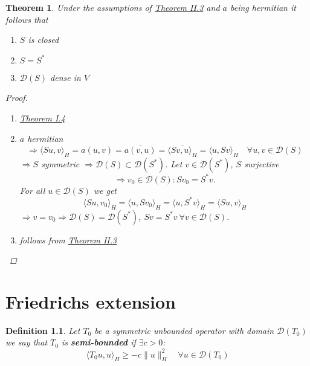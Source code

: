\documentclass[12pt]{extreport} %
\newcommand{\DO}[1]{\mathcal{D}\left( {#1} \right)}
\theoremstyle{named}
\theoremstyle{nnamed}
\theoremstyle{itshape}
\newtheorem{definition}{Definition}  \counterwithin{definition}{chapter}
\newtheorem{theorem}{Theorem}  \counterwithin{theorem}{chapter}
\theoremstyle{normal}
\begin{document}
\begin{theorem}
	Under the assumptions of \hyperref[thm:2.3]{Theorem II.3} and $a$ being hermitian it follows that
		\begin{enumerate}
			\item $S$ is closed
			\item $S = S^*$
			\item $\DO{S}$ dense in $V$
		\end{enumerate}
		
		\begin{proof} ~\
			\begin{enumerate}
				\item \hyperref[thm:1.4]{Theorem I.4}
				\item $a$ hermitian
					$$ \Rightarrow \langle Su, v \rangle_H = a(u, v) = \overline{a(v, u)} = \overline{\langle Sv, u \rangle_H} = \langle u, Sv \rangle_H \quad \forall u, v \in \DO{S} $$
					$\Rightarrow S$ symmetric $\Rightarrow \DO{S} \subset \DO{S^*}$. Let $v \in \DO{S^*}$, $S$ surjective 
						$$\Rightarrow v_0 \in \DO{S}: S v_0 = S^* v. $$ 
					For all $u \in \DO{S}$ we get
					$$ \langle Su, v_0 \rangle_H = \langle u, S v_0 \rangle_H = \langle u, S^* v \rangle_H = \langle S u, v \rangle_H $$
					$\Rightarrow v = v_0 \Rightarrow \DO{S} = \DO{S^*}$, $Sv = S^* v ~\forall v \in \DO{S}$.
				\item follows from \hyperref[thm:2.3]{Theorem II.3}
			\end{enumerate}	
		\end{proof}
\end{theorem}

\chapter{Friedrichs extension}

 
\begin{definition}
	Let $T_0$ be a symmetric unbounded operator with domain $\DO{T_0}$ we say that $T_0$ is \textbf{semi-bounded} if $\exists c > 0$:
		$$ \langle T_0 u, u \rangle_H \geq - c \| u \|_H^2 \quad \forall u \in \DO{T_0} $$	
\end{definition}
\end{document}
